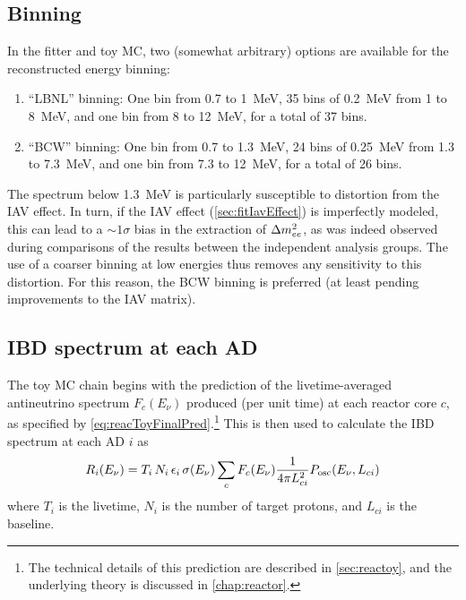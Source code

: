 \documentclass[../thesis.tex]{subfiles}
\begin{document}
\begin{comment}
  The toy MC also generates a ``PredictedIBD'' file which contains the background-free no-oscillation IBD spectra of each detector. As far as I can tell, this is only used in order to calculate a `summed' covariance matrix in which the matrices of the three stages (6, 8, 7AD) are combined, with the weighting determined by the PredictedIBD counts. (Oscillations shouldn't affect this weighting between ADs in the same hall, or the weighting between different stages.) In turn, the summed matrix is not used during the fit, but is only produced as a diagnostic. 
\end{comment}

\subsection{Binning}
\label{sec:fitBinning}

In the fitter and toy MC, two (somewhat arbitrary) options are available for the reconstructed energy binning:

\begin{enumerate}
\item ``LBNL'' binning: One bin from 0.7 to 1~MeV, 35 bins of 0.2~MeV from 1 to 8~MeV, and one bin from 8 to 12~MeV, for a total of 37 bins.
\item ``BCW'' binning: One bin from 0.7 to 1.3~MeV, 24 bins of 0.25~MeV from 1.3 to 7.3~MeV, and one bin from 7.3 to 12~MeV, for a total of 26 bins.
\end{enumerate}

The spectrum below 1.3~MeV is particularly susceptible to distortion from the IAV effect. In turn, if the IAV effect (\autoref{sec:fitIavEffect}) is imperfectly modeled, this can lead to a $\sim1\sigma$ bias in the extraction of $\Delta m^2_{ee}$, as was indeed observed during comparisons of the results between the independent analysis groups. The use of a coarser binning at low energies thus removes any sensitivity to this distortion. For this reason, the BCW binning is preferred (at least pending improvements to the IAV matrix).

\subsection{IBD spectrum at each AD}
\label{sec:fitToyFluxPred}

The toy MC chain begins with the prediction of the livetime-averaged antineutrino spectrum $F_c(E_\nu)$ produced (per unit time) at each reactor core $c$, as specified by \autoref{eq:reacToyFinalPred}.\footnote{The technical details of this prediction are described in \autoref{sec:reactoy}, and the underlying theory is discussed in \autoref{chap:reactor}.} This is then used to calculate the IBD spectrum at each AD $i$ as
\begin{equation}
  \label{eq:fitTrueIbdSpec}
  R_i(E_\nu) = T_i\,N_i\,\epsilon_i\,\sigma(E_\nu) \sum_c F_c(E_\nu) \frac{1}{4\pi L_{ci}^2}
  P_\mathrm{osc}(E_\nu, L_{ci})
\end{equation}
where $T_i$ is the livetime, $N_i$ is the number of target protons, and $L_{ci}$ is the baseline.
\end{document}
